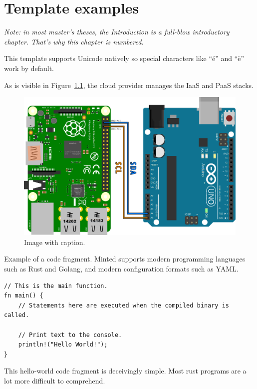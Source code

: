 \chapter{Template examples}
\label{chap:templateexamples}

\textit{Note: in most master's theses, the Introduction is a full-blow introductory chapter. That's why this chapter is numbered.}

This template supports Unicode natively so special characters like ``é'' and ``ë'' work by default.

As is visible in Figure~\ref{fig:cloud_rollen}, the cloud provider manages the IaaS and PaaS stacks.

\begin{figure}[h]
	\centering
	\includegraphics[width=\textwidth]{images/HW_config.png}
	\caption{Image with caption.}
	\label{fig:cloud_rollen}
\end{figure}

Example of a code fragment. Minted supports modern programming languages such as Rust and Golang, and modern configuration formats such as YAML.

\begin{listing}[ht]
\begin{verbatim}
// This is the main function.
fn main() {
    // Statements here are executed when the compiled binary is called.

    // Print text to the console.
    println!("Hello World!");
}
\end{verbatim}
\caption{This hello-world code fragment is deceivingly simple. Most rust programs are a lot more difficult to comprehend.}
\end{listing}



